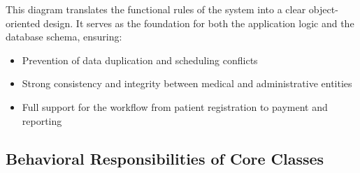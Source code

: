 This diagram translates the functional rules of the system into a clear object-oriented design. It serves as the foundation for both the application logic and the database schema, ensuring:

\begin{itemize}
	\item Prevention of data duplication and scheduling conflicts
	\item Strong consistency and integrity between medical and administrative entities
	\item Full support for the workflow from patient registration to payment and reporting
\end{itemize}
\subsection{Behavioral Responsibilities of Core Classes}

